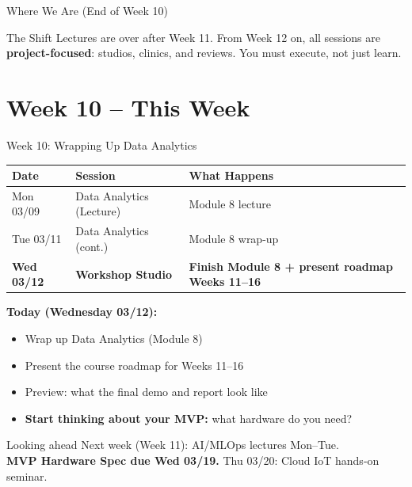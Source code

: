 \documentclass[aspectratio=169,11pt]{beamer}
\begin{document}
\begin{frame}{Where We Are (End of Week 10)}
    \vspace{0.2cm}
    \begin{alertblock}{The Shift}
        Lectures are over after Week 11. From Week 12 on, all sessions are \textbf{project-focused}: studios, clinics, and reviews. You must execute, not just learn.
    \end{alertblock}
\end{frame}

\section{Week 10 -- This Week}

\begin{frame}{Week 10: Wrapping Up Data Analytics}
    \begin{center}
    \footnotesize
    \begin{tabular}{lll}
        \toprule
        \textbf{Date} & \textbf{Session} & \textbf{What Happens} \\
        \midrule
        Mon 03/09 & Data Analytics (Lecture) & Module 8 lecture \\
        Tue 03/11 & Data Analytics (cont.) & Module 8 wrap-up \\
        \textbf{Wed 03/12} & \textbf{Workshop Studio} & \textbf{Finish Module 8 + present roadmap Weeks 11--16} \\
        \bottomrule
    \end{tabular}
    \normalsize
    \end{center}

    \vspace{0.3cm}
    \textbf{Today (Wednesday 03/12):}
    \begin{itemize}
        \item Wrap up Data Analytics (Module 8)
        \item Present the course roadmap for Weeks 11--16
        \item Preview: what the final demo and report look like
        \item \textbf{Start thinking about your MVP:} what hardware do you need?
    \end{itemize}

    \vspace{0.2cm}
    \begin{alertblock}{Looking ahead}
        Next week (Week 11): AI/MLOps lectures Mon--Tue.\\[0.1cm]
        \textbf{MVP Hardware Spec due Wed 03/19.} Thu 03/20: Cloud IoT hands-on seminar.
    \end{alertblock}
\end{frame}
\end{document}
